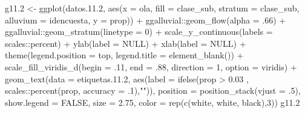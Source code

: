 \documentclass[
  12pt,
]{book}
\newenvironment{Shaded}{\begin{snugshade}}{\end{snugshade}}
\newcommand{\AttributeTok}[1]{\textcolor[rgb]{0.77,0.63,0.00}{#1}}
\newcommand{\ConstantTok}[1]{\textcolor[rgb]{0.00,0.00,0.00}{#1}}
\newcommand{\DecValTok}[1]{\textcolor[rgb]{0.00,0.00,0.81}{#1}}
\newcommand{\FloatTok}[1]{\textcolor[rgb]{0.00,0.00,0.81}{#1}}
\newcommand{\FunctionTok}[1]{\textcolor[rgb]{0.00,0.00,0.00}{#1}}
\newcommand{\NormalTok}[1]{#1}
\newcommand{\OtherTok}[1]{\textcolor[rgb]{0.56,0.35,0.01}{#1}}
\newcommand{\SpecialCharTok}[1]{\textcolor[rgb]{0.00,0.00,0.00}{#1}}
\newcommand{\StringTok}[1]{\textcolor[rgb]{0.31,0.60,0.02}{#1}}
\begin{document}
\begin{Shaded}
\begin{Highlighting}[]
\NormalTok{g11}\FloatTok{.2} \OtherTok{\textless{}{-}} 
  \FunctionTok{ggplot}\NormalTok{(datos.}\FloatTok{11.2}\NormalTok{, }\FunctionTok{aes}\NormalTok{(}\AttributeTok{x =}\NormalTok{ ola, }\AttributeTok{fill =}\NormalTok{ clase\_sub, }\AttributeTok{stratum =}\NormalTok{ clase\_sub, }
                          \AttributeTok{alluvium =}\NormalTok{ idencuesta, }\AttributeTok{y =}\NormalTok{ prop)) }\SpecialCharTok{+}
\NormalTok{  ggalluvial}\SpecialCharTok{::}\FunctionTok{geom\_flow}\NormalTok{(}\AttributeTok{alpha =}\NormalTok{ .}\DecValTok{66}\NormalTok{) }\SpecialCharTok{+} 
\NormalTok{  ggalluvial}\SpecialCharTok{::}\FunctionTok{geom\_stratum}\NormalTok{(}\AttributeTok{linetype =} \DecValTok{0}\NormalTok{) }\SpecialCharTok{+}
  \FunctionTok{scale\_y\_continuous}\NormalTok{(}\AttributeTok{labels =}\NormalTok{ scales}\SpecialCharTok{::}\NormalTok{percent) }\SpecialCharTok{+} 
  \FunctionTok{ylab}\NormalTok{(}\AttributeTok{label =} \ConstantTok{NULL}\NormalTok{) }\SpecialCharTok{+}
  \FunctionTok{xlab}\NormalTok{(}\AttributeTok{label =} \ConstantTok{NULL}\NormalTok{) }\SpecialCharTok{+} 
  \FunctionTok{theme}\NormalTok{(}\AttributeTok{legend.position =} \StringTok{\textquotesingle{}top\textquotesingle{}}\NormalTok{,}
        \AttributeTok{legend.title =} \FunctionTok{element\_blank}\NormalTok{()) }\SpecialCharTok{+}
  \FunctionTok{scale\_fill\_viridis\_d}\NormalTok{(}\AttributeTok{begin =}\NormalTok{ .}\DecValTok{11}\NormalTok{, }\AttributeTok{end =}\NormalTok{ .}\DecValTok{88}\NormalTok{, }\AttributeTok{direction =} \DecValTok{1}\NormalTok{, }\AttributeTok{option =} \StringTok{\textquotesingle{}viridis\textquotesingle{}}\NormalTok{) }\SpecialCharTok{+}
  \FunctionTok{geom\_text}\NormalTok{(}\AttributeTok{data =}\NormalTok{ etiquetas.}\FloatTok{11.2}\NormalTok{, }
            \FunctionTok{aes}\NormalTok{(}\AttributeTok{label =} \FunctionTok{ifelse}\NormalTok{(prop }\SpecialCharTok{\textgreater{}} \FloatTok{0.03}\NormalTok{ , scales}\SpecialCharTok{::}\FunctionTok{percent}\NormalTok{(prop, }\AttributeTok{accuracy =}\NormalTok{ .}\DecValTok{1}\NormalTok{),}\StringTok{""}\NormalTok{)),}
            \AttributeTok{position =} \FunctionTok{position\_stack}\NormalTok{(}\AttributeTok{vjust =}\NormalTok{ .}\DecValTok{5}\NormalTok{),}
            \AttributeTok{show.legend =} \ConstantTok{FALSE}\NormalTok{,}
            \AttributeTok{size =} \FloatTok{2.75}\NormalTok{,}
            \AttributeTok{color =} \FunctionTok{rep}\NormalTok{(}\FunctionTok{c}\NormalTok{(}\StringTok{\textquotesingle{}white\textquotesingle{}}\NormalTok{, }\StringTok{\textquotesingle{}white\textquotesingle{}}\NormalTok{, }\StringTok{\textquotesingle{}black\textquotesingle{}}\NormalTok{),}\DecValTok{3}\NormalTok{))}
\NormalTok{g11}\FloatTok{.2}
\end{Highlighting}
\end{Shaded}
\end{document}
